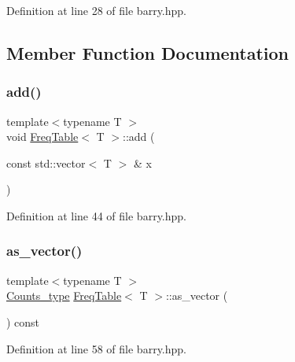 Definition at line 28 of file barry.\+hpp.



\subsection{Member Function Documentation}
\mbox{\label{classbarry_1_1_freq_table_a919e08556ba3aa9535a64827315bb89a}} 
\subsubsection{\texorpdfstring{add()}{add()}}
{\footnotesize\ttfamily template$<$typename T $>$ \\
void \hyperlink{classbarry_1_1_freq_table}{Freq\+Table}$<$ T $>$\+::add (\begin{DoxyParamCaption}\item[{const std\+::vector$<$ T $>$ \&}]{x }\end{DoxyParamCaption})\hspace{0.3cm}{\ttfamily [inline]}}



Definition at line 44 of file barry.\+hpp.

\mbox{\label{classbarry_1_1_freq_table_a1898e62605d8753e170189936d403e05}} 
\subsubsection{\texorpdfstring{as\+\_\+vector()}{as\_vector()}}
{\footnotesize\ttfamily template$<$typename T $>$ \\
\hyperlink{namespacebarry_a3e2d8c3b6cf602107559d4237d9f1315}{Counts\+\_\+type} \hyperlink{classbarry_1_1_freq_table}{Freq\+Table}$<$ T $>$\+::as\+\_\+vector (\begin{DoxyParamCaption}{ }\end{DoxyParamCaption}) const\hspace{0.3cm}{\ttfamily [inline]}}



Definition at line 58 of file barry.\+hpp.

